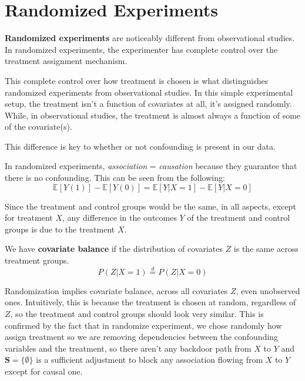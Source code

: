 \chapter{Randomized Experiments}
\textbf{Randomized experiments} are noticeably different from observational studies.
In randomized experiments, the experimenter has complete control over the treatment
assignment mechanism.

This complete control over how treatment is chosen is what distinguishes randomized
experiments from observational studies. In this simple experimental setup, the
treatment isn't a function of covariates at all, it's assigned randomly. While,
in observational studies, the treatment is almost always a function of some of
the covariate(s).

This difference is key to whether or not confounding is present in our data.

In randomized experiments, \textit{association} = \textit{causation} because they
guarantee that there is no confounding. This can be seen from the following:
\begin{equation}
    \mathbb{E}[Y(1)] -  \mathbb{E}[Y(0)] = \mathbb{E}[Y| X = 1] - \mathbb{E}[Y | X = 0]
\end{equation}

Since the treatment and control groups would be the same, in all aspects, except
for treatment $X$, any difference in the outcomes $Y$ of the treatment and control
groups is due to the treatment $X$.
\begin{definition}
    We have \textbf{covariate balance} if the distribution of covariates $Z$ is
    the same across treatment groups.
    \begin{equation}
        P(Z|X = 1) \stackrel{d}{=} P(Z|X = 0)
    \end{equation}
\end{definition}

Randomization implies covariate balance, across all covariates $Z$, even unobserved
ones. Intuitively, this is because the treatment is chosen at random, regardless
of $Z$, so the treatment and control groups should look very similar. This is
confirmed by the fact that in randomize experiment, we chose randomly how assign
treatment so we are removing dependencies between the confounding variables
and the treatment, so there aren't any backdoor path from $X$ to $Y$ and $\mathbf{S} =\{\emptyset\}$
is a sufficient adjustment to block any association flowing from $X$ to $Y$ except
for causal one.

